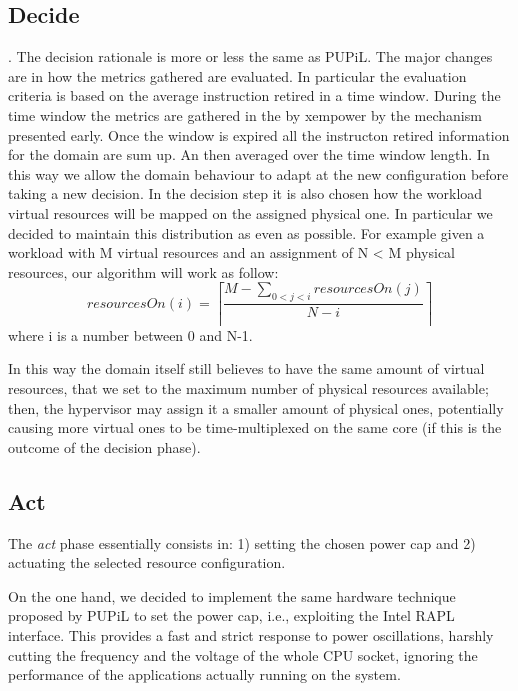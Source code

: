 \subsection{Decide}
.
The decision rationale is more or less the same as PUPiL. The major changes are in how the metrics gathered are evaluated. In particular the evaluation criteria is based on the average instruction retired in a time window. During the time window the metrics are gathered in the by xempower by the mechanism presented early. Once the window is expired all the instructon retired information for the domain are sum up. An then averaged over the time window length. In this way we allow the domain behaviour to adapt at the new configuration before taking a new decision.
In the decision step it is also chosen how the workload virtual resources will be mapped on the assigned physical one. In particular we decided to maintain this distribution as even as possible. For example given a workload with M virtual resources and an assignment of N < M physical resources, our algorithm will work as follow:
\begin{equation}
resourcesOn(i) = \left\lceil{\frac{M - \displaystyle\sum_{0<j<i} resourcesOn(j)}{N-i}}\right\rceil
\end{equation}
where i is a number between 0 and N-1.

In this way the domain itself still believes to have the same amount of virtual resources, that we set to the maximum number of physical resources available; then, the hypervisor may assign it a smaller amount of physical ones, potentially causing more virtual ones to be time-multiplexed on the same core (if this is the outcome of the decision phase).

\subsection{Act}
The \emph{act} phase essentially consists in: 1) setting the chosen power cap and 2) actuating the selected resource configuration.

On the one hand, we decided to implement the same hardware technique proposed by PUPiL to set the power cap, i.e., exploiting the Intel \gls{RAPL} interface. This provides a fast and strict response to power oscillations, harshly cutting the frequency and the voltage of the whole CPU socket, ignoring the performance of the applications actually running on the system.

